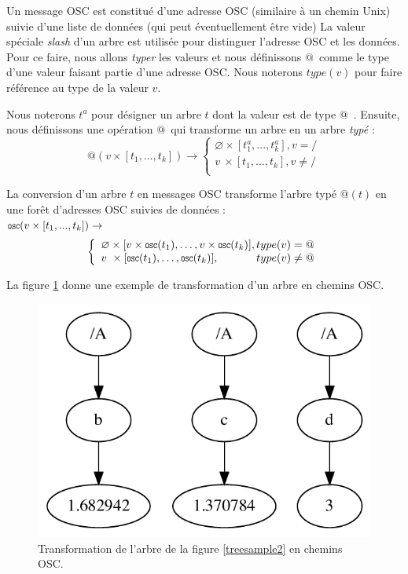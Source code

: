 \documentclass{article}
\makeatletter
\newcommand{\llist}	[1]		{\ensuremath{[#1_1,...,#1_k]}}
\newcommand{\forest}	{\ensuremath{\varnothing}}
\newcommand{\toAddress}	{\ensuremath{\text{@}}}
\newcommand{\toOSCAddress}	{\ensuremath{{\scriptsize \texttt{OSC}}}}
\newcommand{\taddress}	{\ensuremath{\text{@}}}
\newcommand{\etc}		{\ensuremath{\text{…}}}
\makeatother
\begin{document}
Un message OSC est constitué d'une adresse OSC (similaire à un chemin Unix) suivie d'une liste de données (qui peut éventuellement être vide)
La valeur spéciale \emph{slash} d'un arbre est utilisée pour distinguer l'adresse OSC et les données. Pour ce faire, nous allons \emph{typer} les valeurs et nous définissons \taddress\ comme le type d'une valeur faisant partie d'une adresse OSC. Nous noterons $type(v)$ pour faire référence au type de la valeur $v$.

Nous noterons $t^a$ pour désigner un arbre $t$ dont la valeur est de type \taddress\ .
Ensuite, nous définissons une opération \toAddress\ qui transforme un arbre en un arbre \emph{typé} :
\[
    \toAddress (v \times \llist{t}) \to 
\left\{
\begin{array}{l}
	\forest \times \llist{t^a} , v = /\\
	v \ \times \llist{t} , v \neq / \\
\end{array}
\right.
\]

La conversion d'un arbre $t$ en messages OSC transforme l'arbre typé $\toAddress (t)$ en une forêt d'adresses OSC suivies de données :\\

\vspace*{2mm}
\hspace*{5mm} $\toOSCAddress (v \times \llist{t}) \to$
\[
\left\{
\begin{array}{l}
	\forest \times [ v \times \toOSCAddress(t_1),\etc , v \times \toOSCAddress(t_k)] , type(v) = \taddress\\
	v \ \times [ \toOSCAddress(t_1),\etc , \toOSCAddress(t_k)] , \hspace{12mm} type(v) \neq \taddress \\
\end{array}
\right.
\]

La figure \ref{pathssample4} donne une exemple de transformation d'un arbre en chemins OSC.
\begin{figure}[htbp]
\begin{center}
\includegraphics[width=0.6\columnwidth]{paths/sample3}
\caption{Transformation de l'arbre de la figure \ref{treesample2} en chemins OSC.}
\label{pathssample4}
\end{center}
\end{figure}
\end{document}
